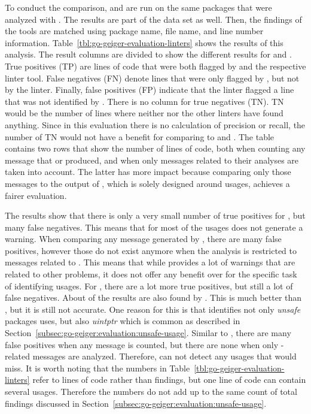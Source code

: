 To conduct the comparison, \toolVet{} and \toolGosec{} are run on the same \packagesAnalyzed{} packages that were
analyzed with \toolGeiger{}.
The results are part of the data set as well.
Then, the findings of the tools are matched using package name, file name, and line number information.
Table~\ref{tbl:go-geiger-evaluation-linters} shows the results of this analysis.
The result columns are divided to show the different results for \toolVet{} and \toolGosec{}.
True positives (TP) are lines of code that were both flagged by \toolGeiger{} and the respective linter tool.
False negatives (FN) denote lines that were only flagged by \toolGeiger{}, but not by the linter.
Finally, false positives (FP) indicate that the linter flagged a line that was not identified by \toolGeiger{}.
There is no column for true negatives (TN).
TN would be the number of lines where neither \toolGeiger{} nor the other linters have found anything.
Since in this evaluation there is no calculation of precision or recall, the number of TN would not have a benefit for
comparing \toolGeiger{} to \toolVet{} and \toolGosec{}.
The table contains two rows that show the number of lines of code, both when counting any message that \toolVet{} or
\toolGosec{} produced, and when only messages related to their \unsafe{} analyses are taken into account.
The latter has more impact because comparing only those messages to the output of \toolGeiger{}, which is solely
designed around \unsafe{} usages, achieves a fairer evaluation.



The results show that there is only a very small number of true positives for \toolVet{}, but many false negatives.
This means that for most of the \unsafe{} usages \toolVet{} does not generate a warning.
When comparing any message generated by \toolVet{}, there are many false positives, however those do not exist anymore
when the analysis is restricted to \toolVet{} messages related to \unsafe{}.
This means that while \toolVet{} provides a lot of warnings that are related to other problems, it does not offer any
benefit over \toolGeiger{} for the specific task of identifying \unsafe{} usages.
For \toolGosec{}, there are a lot more true positives, but still a lot of false negatives.
About  of the \toolGeiger{} results are also found by \toolGosec{}.
This is much better than \toolVet{}, but it is still not accurate.
One reason for this is that \toolGeiger{} identifies not only \textit{unsafe} packages uses, but also \textit{uintptr}
which is common as described in Section~\ref{subsec:go-geiger:evaluation:unsafe-usage}.
Similar to \toolVet{}, there are many false positives when any \toolGosec{} message is counted, but there are none when
only \unsafe{}-related messages are analyzed.
Therefore, \toolGosec{} can not detect any usages that \toolGeiger{} would miss.
It is worth noting that the numbers in Table~\ref{tbl:go-geiger-evaluation-linters} refer to lines of code rather than
\unsafe{} findings, but one line of code can contain several \unsafe{} usages.
Therefore the numbers do not add up to the same count of total findings discussed in
Section~\ref{subsec:go-geiger:evaluation:unsafe-usage}.

